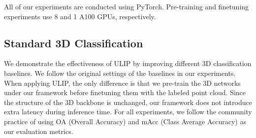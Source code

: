 \documentclass[10pt,twocolumn,letterpaper]{article}
\begin{document}
All of our experiments are conducted using PyTorch. Pre-training and finetuning experiments use 8 and 1 A100 GPUs, respectively.

\subsection{Standard 3D Classification}
We demonstrate the effectiveness of ULIP by improving different 3D classification baselines. We follow the original settings of the baselines in our experiments. When applying ULIP, the only difference is that we pre-train the 3D networks under our framework before finetuning them with the labeled point cloud. Since the structure of the 3D backbone is unchanged, our framework does not introduce extra latency during inference time.
For all experiments, we follow the community practice of using OA (Overall Accuracy) and mAcc (Class Average Accuracy) as our evaluation metrics.
\end{document}

